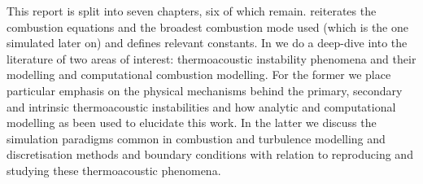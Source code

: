 This report is split into seven chapters, six of which remain.  reiterates the combustion equations and the broadest combustion mode used (which is the one simulated later on) and defines relevant constants. In  we do a deep-dive into the literature of two areas of interest: thermoacoustic instability phenomena and their modelling and computational combustion modelling. For the former we place particular emphasis on the physical mechanisms behind the primary, secondary and intrinsic thermoacoustic instabilities and how analytic and computational modelling as been used to elucidate this work. In the latter we discuss the simulation paradigms common in combustion and turbulence modelling and discretisation methods and boundary conditions with relation to reproducing and studying these thermoacoustic phenomena.






